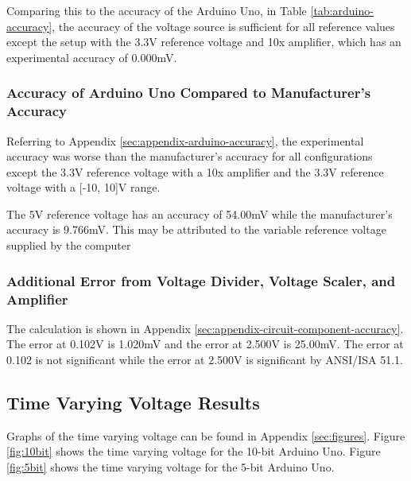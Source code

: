 Comparing this to the accuracy of the Arduino Uno, in Table \ref{tab:arduino-accuracy}, the accuracy of 
the voltage source is sufficient for all reference values except the setup with the 3.3V reference voltage and 10x amplifier, which has an experimental accuracy of 0.000mV.


\subsubsection{Accuracy of Arduino Uno Compared to Manufacturer's Accuracy}
\noindent Referring to Appendix \ref{sec:appendix-arduino-accuracy}, the experimental accuracy was worse than the manufacturer's accuracy for all configurations 
except the 3.3V reference voltage with a 10x amplifier and the 3.3V reference voltage with a [-10, 10]V range.

The 5V reference voltage has an accuracy of 54.00mV while the manufacturer's accuracy is 9.766mV. This may be attributed to the variable reference voltage supplied by the computer


\subsubsection{Additional Error from Voltage Divider, Voltage Scaler, and Amplifier}

\noindent The calculation is shown in Appendix \ref{sec:appendix-circuit-component-accuracy}. The error at 0.102V is 1.020mV and the error at 2.500V is 25.00mV. The error at 0.102 
is not significant while the error at 2.500V is significant by ANSI/ISA 51.1.

\subsection{Time Varying Voltage Results}
\noindent Graphs of the time varying voltage can be found in Appendix \ref{sec:figures}. Figure \ref{fig:10bit} shows the time varying voltage for the 10-bit Arduino Uno. 
Figure \ref{fig:5bit} shows the time varying voltage for the 5-bit Arduino Uno. 

